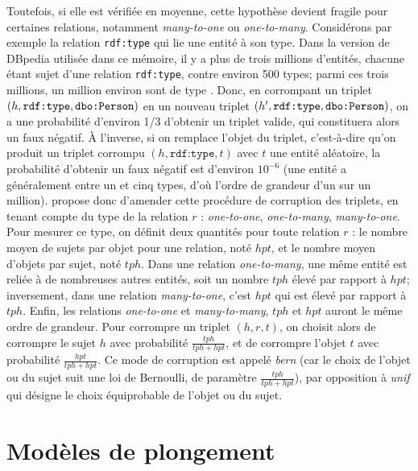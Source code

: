 Toutefois, si elle est vérifiée en moyenne, cette hypothèse devient fragile pour certaines relations, notamment \textit{many-to-one} ou \textit{one-to-many}. Considérons par exemple la relation \texttt{rdf:type} qui lie une entité à son type. Dans la version de DBpedia utilisée dans ce mémoire, il y a plus de trois millions d'entités, chacune étant sujet d'une relation \texttt{rdf:type}, contre environ 500 types; parmi ces trois millions, un million environ sont de type . Donc, en corrompant un triplet $(h, \texttt{rdf:type}, \texttt{dbo:Person})$ en un nouveau triplet $(h', \texttt{rdf:type}, \texttt{dbo:Person})$, on a une probabilité d'environ 1/3 d'obtenir un triplet valide, qui constituera alors un faux négatif. À l'inverse, si on remplace l'objet du triplet, c'est-à-dire qu'on produit un triplet corrompu  $(h, \texttt{rdf:type}, t)$ avec $t$ une entité aléatoire, la probabilité d'obtenir un faux négatif est d'environ $10^{-6}$ (une entité a généralement entre un et cinq types, d'où l'ordre de grandeur d'un sur un million).
\cite{transh} propose donc d'amender cette procédure de corruption des triplets, en tenant compte du type de la relation $r$ : \textit{one-to-one}, \textit{one-to-many}, \textit{many-to-one}. Pour mesurer ce type, on définit deux quantités pour toute relation $r$ : le nombre moyen de sujets par objet pour une relation, noté $hpt$, et le nombre moyen d'objets par sujet, noté $tph$. Dans une relation \textit{one-to-many}, une même entité est reliée à de nombreuses autres entités, soit un nombre $tph$ élevé par rapport à $hpt$; inversement, dans une relation \textit{many-to-one}, c'est $hpt$ qui est élevé par rapport à $tph$. Enfin, les relations \textit{one-to-one} et \textit{many-to-many}, $tph$ et $hpt$ auront le même ordre de grandeur. Pour corrompre un triplet $(h, r, t)$, on choisit alors de corrompre le sujet $h$ avec probabilité $\frac{tph}{tph + hpt}$, et de corrompre l'objet $t$ avec probabilité $\frac{hpt}{tph + hpt}$. Ce mode de corruption est appelé \textit{bern} (car le choix de l'objet ou du sujet suit une loi de Bernoulli, de paramètre $\frac{tph}{tph + hpt}$), par opposition à \textit{unif} qui désigne le choix équiprobable de l'objet ou du sujet.


\section{Modèles de plongement}
\label{sec:kge-models}

